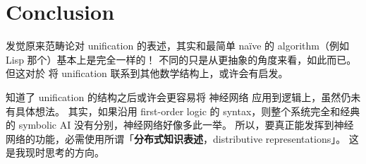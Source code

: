 \documentclass[12pt, orivec]{article}
\newcommand{\cc}[2]{#1}
\newcommand{\cc}[2]{#2}
\begin{document}
\section*{Conclusion}

\cc{发觉原来范畴论对 unification 的表述，其实和最简单 na\"{i}ve 的 algorithm（例如 Lisp 那个）基本上是完全一样的！  不同的只是从更抽象的角度来看，如此而已。  但这对於 将 unification 联系到其他数学结构上，或许会有启发。
}{
It is found that the original category theory's expression of unification is basically the same as the simplest na\"{i}ve's algorithm (such as Lisp)! The difference is only from a more abstract point of view, but that's it. But It may be instructive to link the unification to other mathematical structures.
}

\cc{知道了 unification 的结构之后或许会更容易将 神经网络 应用到逻辑上，虽然仍未有具体想法。  其实，如果沿用 first-order logic 的 syntax，则整个系统完全和经典的 symbolic AI 没有分别，神经网络好像多此一举。  所以，要真正能发挥到神经网络的功能，必需使用所谓「\textbf{分布式知识表述}，distributive representations」。  这是我现时思考的方向。
}{
Knowing the structure of unification may make it easier to apply neural networks to logic, although there are still no specific ideas. In fact, if the syntax of first-order logic is used, the whole system is completely different from the classic symbolic AI, and the neural network seems to be more than one. Therefore, in order to truly play the role of the neural network, it is necessary to use the so-called "\textbf{distributed representations}". This is the direction I am thinking about now.
}

\nocite{Rydeheard1988}
\nocite{Awodey2006}
\nocite{Simmons2011}
\nocite{Goguen1989}
\nocite{Robinson1965}
\printbibliography
\end{document}
